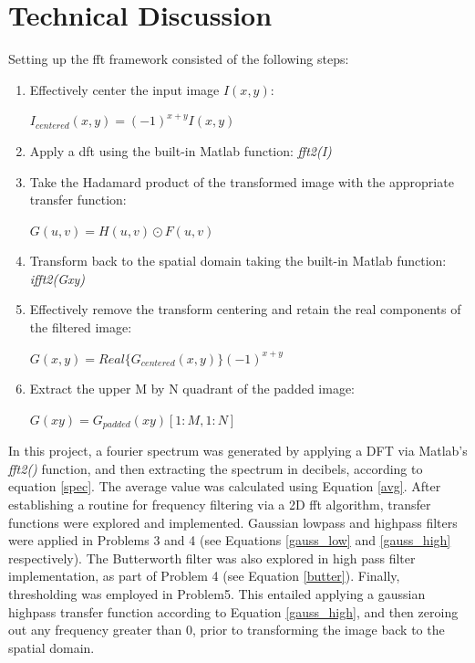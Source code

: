 \documentclass[./rarnold_report4.tex]{subfiles}
\begin{document}
\clearpage

\section*{Technical Discussion}

\noindent Setting up the fft framework consisted of the following steps:
\begin{enumerate}

\item Effectively center the input image $I(x,y)$: \\ \begin{center} $I_{centered}(x,y) = (-1)^{x+y} I(x,y)$ \end{center}
\item Apply a dft using the built-in Matlab function: \textit{fft2(I)}
\item Take the Hadamard product of the transformed image with the appropriate transfer function: \\ \begin{center} $G(u,v) = H(u,v) \odot F(u,v)$ \end{center}
\item Transform back to the spatial domain taking the built-in Matlab function: \textit{ifft2(Gxy)}
\item Effectively remove the transform centering and retain the real components of the filtered image: \\ \begin{center} $G(x,y) =  Real\{G_{centered}(x,y)\} (-1)^{x+y}$ \end{center}
\item Extract the upper M by N quadrant of the padded image: \\ \begin{center} $G(xy) = G_{padded}(xy)[1:M, 1:N]$ \end{center}
\end{enumerate}

\clearpage

\noindent In this project, a fourier spectrum was generated by applying a DFT via Matlab's \textit{fft2()} function, and then extracting the spectrum in decibels, according to equation \eqref{spec}.  The average value was calculated using Equation \eqref{avg}. After establishing a routine for frequency filtering via a 2D fft algorithm, transfer functions were explored and implemented. Gaussian lowpass and highpass filters were applied in Problems 3 and 4 (see Equations \eqref{gauss_low} and \eqref{gauss_high} respectively). The Butterworth filter was also explored in high pass filter implementation, as part of Problem 4 (see Equation \eqref{butter}).  Finally, thresholding was employed in Problem5.  This entailed applying a gaussian highpass transfer function according to Equation \eqref{gauss_high}, and then zeroing out any frequency greater than 0, prior to transforming the image back to the spatial domain.
\end{document}
